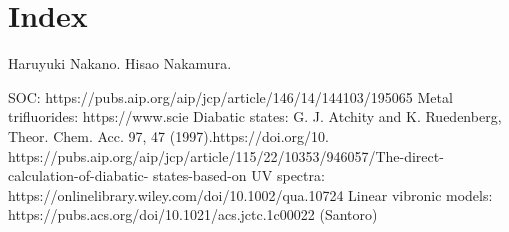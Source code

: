 \documentclass[letterpaper, 12pt, oneside]{report}
\newif\iffinalize
\newif\iffinalize
\begin{document}
\iffinalize \addcontentsline{toc}{chapter}{Appendices} \chapter*{Appendices} \newpage
\begin{lstlisting}[
frame=single, numbers=left, firstnumber=1, backgroundcolor=\color{yellow!10},
label={lst:c1-overlap_matrix}, caption={\centering
    Toby Zeng's handcrafted \$REFDET group in \code{RhF3_SPK_gmcpt_C1_e_mult5_diis_15st_diab_refG.inp}
},
]
 $REFDET
  15
 1 1
      206   -1.000000
 2 4
      134   -0.500000
      167    0.500000
      186   -0.500000
       81    0.500000
 3 6
       59   -0.408248
       26   -0.408248
       98   -0.408248
       45    0.408248
      112    0.408248
      146   -0.408248
 4 4
        6   -0.500000
       11    0.500000
       31   -0.500000
       86    0.500000
 5 1
        1   -1.000000
 6 1
      207    1.000000
 7 4
       82    0.500000
      135   -0.500000
      168    0.500000
      196   -0.500000
 8 6
       99    0.408248
       46   -0.408248
      156    0.408248
       27    0.408248
      122   -0.408248
       69    0.408248
 9 4
        7   -0.500000
       16    0.500000
       91    0.500000
       36   -0.500000
 10 1
        2    1.000000
 11 1
      208    1.000000
 12 4
       83   -0.500000
      188   -0.500000
      136    0.500000
      197    0.500000
 13 6
      114    0.408248
      123   -0.408248
       61   -0.408248
      176    0.408248
       28    0.408248
       70    0.408248
 14 4
       13   -0.500000
      106    0.500000
       51   -0.500000
       17    0.500000
 15 1
        8    1.000000
 $END
\end{lstlisting}
\else \fi

\iffinalize \addcontentsline{toc}{chapter}{Glossary} \chapter*{Glossary} \newpage
\else \fi

\iffinalize {} \chapter*{Index} \newpage

Haruyuki Nakano. Hisao Nakamura.

SOC: https://pubs.aip.org/aip/jcp/article/146/14/144103/195065 Metal trifluorides: https://www.scie
Diabatic states: G. J. Atchity and K. Ruedenberg, Theor. Chem. Acc. 97, 47 (1997).https://doi.org/10.
https://pubs.aip.org/aip/jcp/article/115/22/10353/946057/The-direct-calculation-of-diabatic-
states-based-on
UV spectra: https://onlinelibrary.wiley.com/doi/10.1002/qua.10724
Linear vibronic models: https://pubs.acs.org/doi/10.1021/acs.jctc.1c00022 (Santoro)
\end{document}
